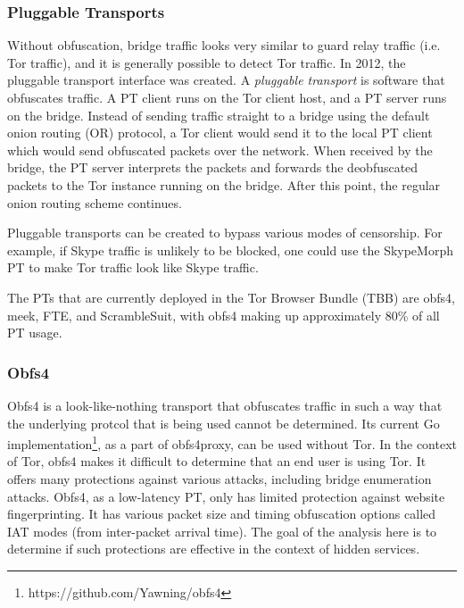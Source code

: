 \documentclass[11pt]{article}
\begin{document}
\subsubsection{Pluggable Transports}
Without obfuscation, bridge traffic looks very similar to guard relay traffic (i.e. Tor traffic), and it is generally possible to detect Tor traffic.
In 2012, the pluggable transport interface was created. A \textit{pluggable transport} is software that obfuscates traffic. A PT client runs on the Tor client host, and a PT server runs on the bridge. Instead of sending traffic straight to a bridge using the default onion routing (OR) protocol, a Tor client would send it to the local PT client which would send obfuscated packets over the network. When received by the bridge, the PT server interprets the packets and forwards the deobfuscated packets to the Tor instance running on the bridge. After this point, the regular onion routing scheme continues.

Pluggable transports can be created to bypass various modes of censorship. For example, if Skype traffic is unlikely to be blocked, one could use the SkypeMorph\cite{skypemorph} PT to make Tor traffic look like Skype traffic.

The PTs that are currently deployed in the Tor Browser Bundle (TBB) are obfs4, meek, FTE, and ScrambleSuit\cite{pts}, with obfs4 making up approximately 80\% of all PT usage.

\subsubsection{Obfs4}
Obfs4 is a look-like-nothing transport that obfuscates traffic in such a way that the underlying protcol that is being used cannot be determined. Its current Go implementation\footnote{https://github.com/Yawning/obfs4}, as a part of obfs4proxy, can be used without Tor. In the context of Tor, obfs4 makes it difficult to determine that an end user is using Tor. It offers many protections against various attacks, including bridge enumeration attacks. Obfs4, as a low-latency PT, only has limited protection against website fingerprinting. It has various packet size and timing obfuscation options called IAT modes (from inter-packet arrival time). The goal of the analysis here is to determine if such protections are effective in the context of hidden services.
\end{document}
